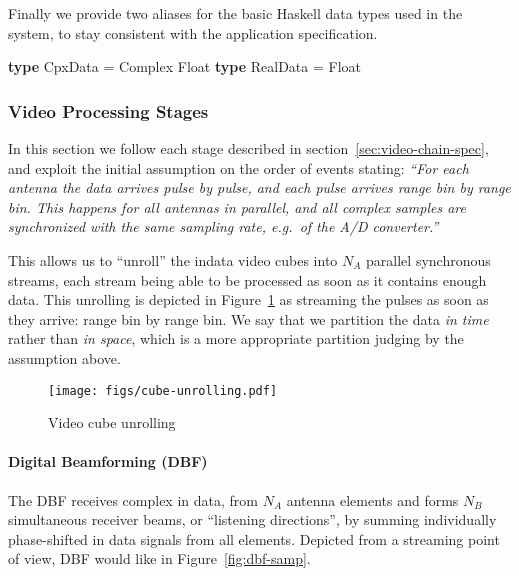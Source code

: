 \documentclass[
  a4paper,
]{article}
\newenvironment{Shaded}{}{}
\newcommand{\DataTypeTok}[1]{\textcolor[rgb]{0.56,0.13,0.00}{#1}}
\newcommand{\FunctionTok}[1]{\textcolor[rgb]{0.02,0.16,0.49}{#1}}
\newcommand{\KeywordTok}[1]{\textcolor[rgb]{0.00,0.44,0.13}{\textbf{#1}}}
\let\oldparagraph\paragraph
\renewcommand{\paragraph}[1]{\oldparagraph{#1}\mbox{}}
\begin{document}
Finally we provide two aliases for the basic Haskell data types used in
the system, to stay consistent with the application specification.

\begin{Shaded}
\begin{Highlighting}[numbers=left,,firstnumber=115,]
\KeywordTok{type} \DataTypeTok{CpxData}  \FunctionTok{=} \DataTypeTok{Complex} \DataTypeTok{Float}
\KeywordTok{type} \DataTypeTok{RealData} \FunctionTok{=} \DataTypeTok{Float}
\end{Highlighting}
\end{Shaded}

\hypertarget{video-processing-stages}{%
\subsubsection{Video Processing Stages}\label{video-processing-stages}}

In this section we follow each stage described in
section~\ref{sec:video-chain-spec}, and exploit the initial assumption
on the order of events stating: \emph{``For each antenna the data
arrives \emph{pulse by pulse}, and each pulse arrives \emph{range bin by
range bin}. This happens \emph{for all antennas in parallel}, and all
complex samples are synchronized with the same sampling rate, e.g.~of
the A/D converter.''}

This allows us to ``unroll'' the indata video cubes into \(N_A\)
parallel synchronous streams, each stream being able to be processed as
soon as it contains enough data. This unrolling is depicted in
Figure~\ref{fig:cube-unrolling} as streaming the pulses as soon as they
arrive: range bin by range bin. We say that we partition the data
\emph{in time} rather than \emph{in space}, which is a more appropriate
partition judging by the assumption above.

\begin{figure}
\hypertarget{fig:cube-unrolling}{%
\centering
\texttt{[image: figs/cube-unrolling.pdf]}
\caption{Video cube unrolling}\label{fig:cube-unrolling}
}
\end{figure}

\hypertarget{sec:dbf-atom}{%
\paragraph{Digital Beamforming (DBF)}\label{sec:dbf-atom}}

The DBF receives complex in data, from \(N_A\) antenna elements and
forms \(N_B\) simultaneous receiver beams, or ``listening directions'',
by summing individually phase-shifted in data signals from all elements.
Depicted from a streaming point of view, DBF would like in
Figure~\ref{fig:dbf-samp}.
\end{document}

